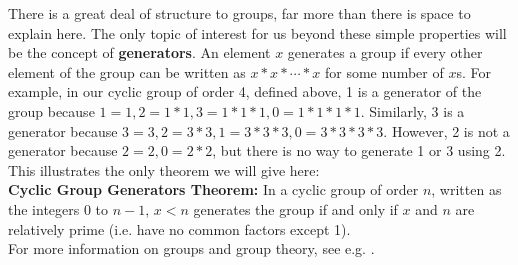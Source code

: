 \documentclass[11pt]{article}
\begin{document}
There is a great deal of structure to groups, far more than there is space to explain here. The only topic of interest for us beyond these simple properties will be the concept of \textbf{generators}. An element $x$ generates a group if every other element of the group can be written as $x*x*\cdots*x$ for some number of $x$s. For example, in our cyclic group of order 4, defined above, 1 is a generator of the group because $1 = 1, 2 = 1 * 1, 3 = 1 * 1 * 1, 0 = 1 * 1 * 1 * 1$. Similarly, 3 is a generator because $3 = 3, 2 = 3 * 3, 1 = 3 * 3 * 3, 0 = 3 * 3 * 3 * 3$. However, 2 is not a generator because $2 = 2, 0 = 2 * 2$, but there is no way to generate 1 or 3 using 2. This illustrates the only theorem we will give here: \\[11pt]
\textbf{Cyclic Group Generators Theorem:} In a cyclic group of order $n$, written as the integers $0$ to $n-1$, $x < n$ generates the group if and only if $x$ and $n$ are relatively prime (i.e. have no common factors except 1). \\[11pt] 
For more information on groups and group theory, see e.g. \cite{Lang2002}.
 
\end{document}
